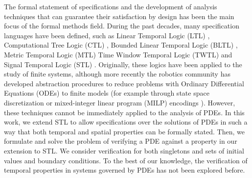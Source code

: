 \documentclass[letterpaper, 10 pt, conference]{ieeeconf/ieeeconf}
\begin{document}
The formal statement of specifications and the development of
analysis techniques that can guarantee their satisfaction by design has been the main
focus of the formal methods field. During the past decades, many specification
languages have been defined, such as Linear Temporal
Logic (LTL) \cite{gerth_simple_1996}, Computational Tree Logic (CTL)
\cite{clarke_automatic_1986}, Bounded Linear Temporal Logic 
(BLTL) \cite{jha_bayesian_2009}, Metric Temporal Logic (MTL) \cite{luo_using_2016} 
Time Window Temporal Logic (TWTL) \cite{AkVaBe-ICRA-2016} and Signal Temporal Logic (STL) 
\cite{donze_robust_2010}. Originally, these logics have been applied to the
study of finite systems, although more recently the robotics community has
developed abstraction procedures to reduce problems with Ordinary
Differential Equations (ODEs) to finite models (for example through state space
discretization \cite{kloetzer_fully_2008} or mixed-integer linear program (MILP) encodings
\cite{raman_model_2014}).
However, these techniques cannot be immediately applied to the analysis of PDEs.
In this work, we extend STL to allow
specifications over the solutions of PDEs in such a way that both temporal and
spatial properties can be formally stated. Then, we formulate and solve the problem 
of verifying a PDE against a property in our extension to STL. We consider verification
for both singletons and sets of initial values and boundary conditions.
To the best of our knowledge, the verification 
of temporal properties in systems governed by PDEs has not been explored before.




\end{document}
